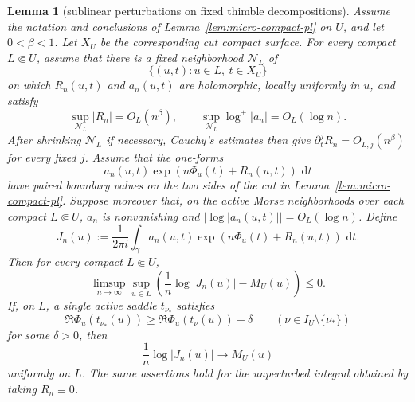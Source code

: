 \documentclass[reqno]{article}
\newtheorem{lem}[theorem]{Lemma}
\theoremstyle{definition}
\theoremstyle{remark}
\theoremstyle{plain}
\newcommand{\dd}{\,\mathrm d}
\begin{document}
\begin{lem}[sublinear perturbations on fixed thimble decompositions]\label{lem:sublinear-cycle-perturb}
Assume the notation and conclusions of Lemma~\ref{lem:micro-compact-pl} on $U$, and let $0<\beta<1$. Let $X_U$ be the corresponding cut compact surface. For every compact $L\Subset U$, assume that there is a fixed neighborhood $\mathcal N_L$ of
\[
\{(u,t):u\in L,\ t\in X_U\}
\]
on which $R_n(u,t)$ and $a_n(u,t)$ are holomorphic, locally uniformly in $u$, and satisfy
\[
\sup_{\mathcal N_L}|R_n|=O_L(n^\beta),
\qquad
\sup_{\mathcal N_L}\log^+ |a_n|=O_L(\log n).
\]
After shrinking $\mathcal N_L$ if necessary, Cauchy's estimates then give $\partial_t^jR_n=O_{L,j}(n^\beta)$ for every fixed $j$. Assume that the one-forms
\[
a_n(u,t)\exp\!\left(n\Phi_u(t)+R_n(u,t)\right)\,\dd t
\]
have paired boundary values on the two sides of the cut in Lemma~\ref{lem:micro-compact-pl}. Suppose moreover that, on the active Morse neighborhoods over each compact $L\Subset U$, $a_n$ is nonvanishing and $\bigl|\log |a_n(u,t)|\bigr|=O_L(\log n)$. Define
\[
J_n(u):=\frac1{2\pi i}\int_\gamma a_n(u,t)
\exp\!\left(n\Phi_u(t)+R_n(u,t)\right)\,\dd t .
\]
Then for every compact $L\Subset U$,
\[
\limsup_{n\to\infty}\sup_{u\in L}
\left(\frac1n\log|J_n(u)|-M_U(u)\right)\le0.
\]
If, on $L$, a single active saddle $t_{\nu_\ast}$ satisfies
\[
\Re\Phi_u(t_{\nu_\ast}(u))\ge
\Re\Phi_u(t_\nu(u))+\delta
\qquad(\nu\in I_U\setminus\{\nu_\ast\})
\]
for some $\delta>0$, then
\[
\frac1n\log|J_n(u)|\longrightarrow M_U(u)
\]
uniformly on $L$. The same assertions hold for the unperturbed integral obtained by taking $R_n\equiv0$.
\end{lem}
\end{document}
